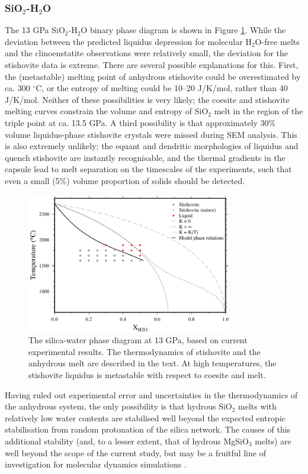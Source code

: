 \documentclass[review]{elsarticle}
\begin{document}
\subsubsection{SiO$_2$-H$_2$O}
The 13 GPa SiO$_2$-H$_2$O binary phase diagram is shown in Figure \ref{fig:SH}. While the deviation between the predicted liquidus depression for molecular H$_2$O-free melts and the clinoenstatite observations were relatively small, the deviation for the stishovite data is extreme. There are several possible explanations for this. First, the (metastable) melting point of anhydrous stishovite could be overestimated by ca. 300 $^{\circ}$C, or the entropy of melting could be 10--20 J/K/mol, rather than 40 J/K/mol. Neither of these possibilities is very likely; the coesite and stishovite melting curves constrain the volume and entropy of SiO$_2$ melt in the region of the triple point at ca. 13.5 GPa. A third possibility is that approximately 30\% volume liquidus-phase stishovite crystals were missed during SEM analysis. This is also extremely unlikely; the equant and dendritic morphologies of liquidus and quench stishovite are instantly recognisable, and the thermal gradients in the capsule lead to melt separation on the timescales of the experiments, such that even a small (5\%) volume proportion of solids should be detected.

\begin{figure}[ht!]
  \centering
      \includegraphics[width=0.8\textwidth]{figures/stishovite}
      \caption{The silica-water phase diagram at 13 GPa, based on current experimental results. The thermodynamics of stishovite and the anhydrous melt are described in the text. At high temperatures, the stishovite liquidus is metastable with respect to coesite and melt.}
  \label{fig:SH}
\end{figure}

Having ruled out experimental error and uncertainties in the thermodynamics of the anhydrous system, the only possibility is that hydrous SiO$_2$ melts with relatively low water contents are stabilised well beyond the expected entropic stabilisation from random protonation of the silica network. The causes of this additional stability (and, to a lesser extent, that of hydrous MgSiO$_3$ melts) are well beyond the scope of the current study, but may be a fruitful line of investigation for molecular dynamics simulations \citep[e.g.][]{KS2010}.
\end{document}
